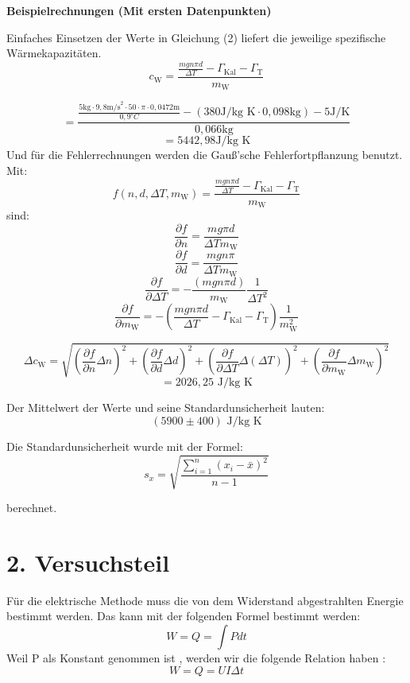 \documentclass[11pt,a4paper]{article} %
\begin{document}
\begin{tcolorbox}[colback=white]
\textbf{Beispielrechnungen (Mit ersten Datenpunkten)}	

Einfaches Einsetzen der Werte in Gleichung (2) liefert die jeweilige spezifische Wärmekapazitäten. 
$$c_\textrm{W} = \frac{\frac{mgn\pi d}{\Delta T} - \Gamma_{\textrm{Kal}} - \Gamma_{\textrm{T}}}{m_\textrm{W}}$$

$$ =\frac{ \frac{ 5 \textrm{kg} \cdot 9,8 \textrm{m/s}^2 \cdot 50 \cdot \pi \cdot 0,0472 \textrm{m}}{0,9^\circ C} - (380 \textrm{J/kg K} \cdot 0,098 \textrm{kg}) - 5 \textrm{J/K}}{0,066\textrm{kg}}$$
$$ = 5442,98 \textrm{J/kg K} $$
Und für die Fehlerrechnungen werden die Gauß'sche Fehlerfortpflanzung benutzt. Mit:
$$f(n,d,\Delta T,m_\textrm{W}) = \frac{\frac{mgn\pi d}{\Delta T} - \Gamma_{\textrm{Kal}} - \Gamma_{\textrm{T}}}{m_\textrm{W}}$$
sind:
$$ \frac{ \partial f}{\partial n} = \frac{mg\pi d}{\Delta T m_{\textrm{W}}} $$ 
$$ \frac{ \partial f}{\partial d}  = \frac{mgn\pi}{\Delta Tm_{\textrm{W}}}$$
$$ \frac{\partial f}{\partial \Delta T} = -\frac{(mgn\pi d)}{m_\textrm{W}} \frac{1}{\Delta T ^2}$$
$$ \frac{\partial f}{\partial m_{\textrm{W}}} = -(\frac{mgn\pi d}{\Delta T} - \Gamma_{\textrm{Kal}} - \Gamma_{\textrm{T}})
 \frac{1}{m_\textrm{W}^2}$$

$$\Delta c_\textrm{W} = \sqrt{ 
	(\frac{ \partial f}{\partial n} \Delta n)^2
	+(\frac{ \partial f}{\partial d} \Delta d)^2
	+(\frac{\partial f}{\partial \Delta T} \Delta (\Delta T))^2
	+ (\frac{\partial f}{\partial m_{\textrm{W}}} \Delta m_{\textrm{W}})^2 }
$$
$$ = 2026,25 \textrm{ J/kg K} $$

\end{tcolorbox}

Der Mittelwert der Werte und seine Standardunsicherheit lauten:
$$(5900 \pm 400) \textrm{ J/kg K}$$

Die Standardunsicherheit wurde mit der Formel:
\begin{equation}
s_x = \sqrt{\frac{\sum_{i=1}^{n}(x_i-\bar{x})^2}{n-1}} 
\end{equation}

berechnet. 

\section{2. Versuchsteil}

Für die elektrische Methode muss die von dem Widerstand abgestrahlten Energie bestimmt werden. Das kann mit der folgenden Formel bestimmt werden:
$$ W = Q = \int P dt $$
Weil P als Konstant genommen ist , werden wir die folgende Relation haben :
$$ W = Q = UI\Delta t $$
\end{document}
